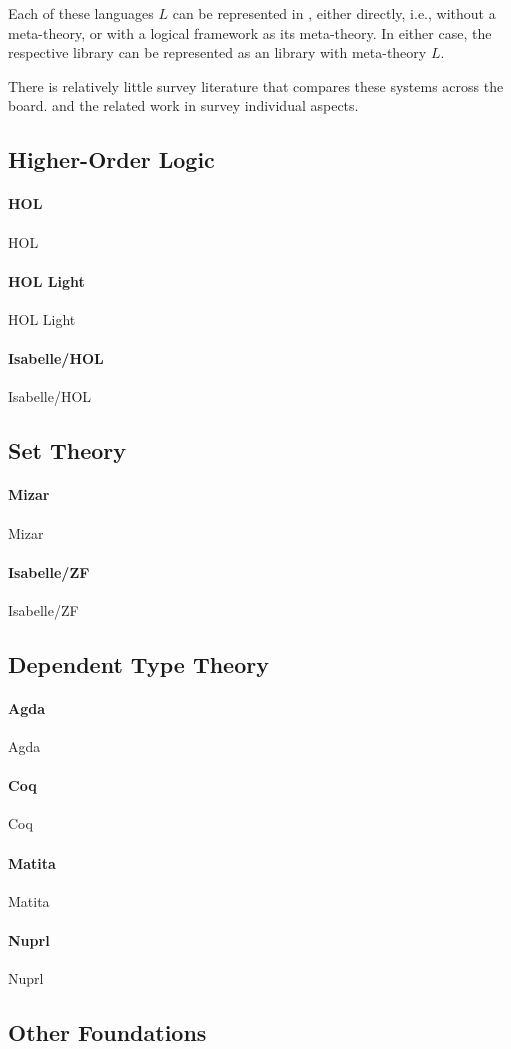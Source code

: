 \documentclass[12pt]{article}
\newcommand{\system}[2][]{\paragraph{#2}#2 \ifnonempty[\cite{#2}]{#1}{\cite{#1}}}
\begin{document}
Each of these languages $L$ can be represented in \mmt, either directly, i.e., without a meta-theory, or with a logical framework as its meta-theory.
In either case, the respective library can be represented as an \mmt library with meta-theory $L$.
\medskip

There is relatively little survey literature that compares these systems across the board.
\cite{wiedijk_provers} and the related work in \cite{RK:mmt:10} survey individual aspects.

\subsection{Higher-Order Logic}

\system{HOL}

\system[hollight]{HOL Light}

\system[isabellehol]{Isabelle/HOL}

\subsection{Set Theory}

\system{Mizar}

\system[isabelle_zf]{Isabelle/ZF}

\subsection{Dependent Type Theory}

\system{Agda}

\system{Coq}

\system{Matita}

\system{Nuprl}

\subsection{Other Foundations}
\end{document}
